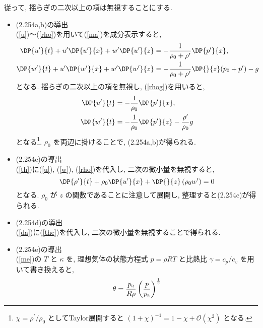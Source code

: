\documentclass[a4j,12pt,openbib,oneside,dvipdfmx]{jsbook}
\begin{document}
従って, 揺らぎの二次以上の項は無視することにする.
\begin{itemize}
\item (2.254a,b)の導出\\
(\ref{u})〜(\ref{rho})を用いて(\ref{ma})を成分表示すると, 
\begin{subequations}
\begin{align}
  \DP{u^\prime}{t}+u^\prime{\DP{u^\prime}{x}}+w^\prime{\DP{u^\prime}{z}}&=-\frac{1}{\rho_0+\rho^\prime}{\DP{p^\prime}{x}},\label{uu}\\
  \DP{w^\prime}{t}+u^\prime{\DP{w^\prime}{x}}+w^\prime{\DP{w^\prime}{z}}&=-\frac{1}{\rho_0+\rho^\prime}{\DP{}{z}}{\left(p_0+p^\prime \right)}-g \label{ww}
\end{align}
\end{subequations}
となる. 揺らぎの二次以上の項を無視し, (\ref{rhog})を用いると,
\begin{subequations}
\begin{align}
  \DP{u^\prime}{t}&=-\frac{1}{\rho_0}{\DP{p^\prime}{x}},\label{u3}\\
  \DP{w^\prime}{t}&=-\frac{1}{\rho_0}\DP{p^\prime}{z}-{\frac{\rho^\prime}{\rho_0}}g \label{w3}
\end{align}
\end{subequations}
となる\footnote{$\chi={\rho^\prime}/{\rho_0}$ としてTaylor展開すると $(1+\chi)^{-1}=1-\chi+\mathcal{O}(\chi^2)$ となる.}. $\rho_0$ を両辺に掛けることで, (2.254a,b)が得られる. 
\par
\item (2.254c)の導出\\
(\ref{th})に(\ref{u}), (\ref{w}), (\ref{rho})を代入し, 二次の微小量を無視すると,
\begin{equation}
  \DP{\rho^\prime}{t}+\rho_0{\DP{u^\prime}{x}}+\DP{}{z}\left({\rho_0}{w^\prime}\right)=0
\end{equation}
となる. $\rho_0$ が $z$ の関数であることに注意して展開し, 整理すると(2.254c)が得られる.
\par
\item (2.254d)の導出\\
(\ref{da})に(\ref{the})を代入し, 二次の微小量を無視することで得られる.
\par
\item (2.254e)の導出\\
(\ref{me})の $T$ と $\kappa$ を, 理想気体の状態方程式 $p={\rho}RT$ と比熱比 $\gamma=c_p/c_v$ を用いて書き換えると, 
\begin{equation}
 \theta={\frac{p_{\scalebox{0.5}{R}}}{{R}\rho}}\left({\frac{p}{p_{\scalebox{0.5}{R}}}}\right)^{\frac{1}{\gamma}} \label{the2}

\end{equation}
\end{itemize}
\end{document}
